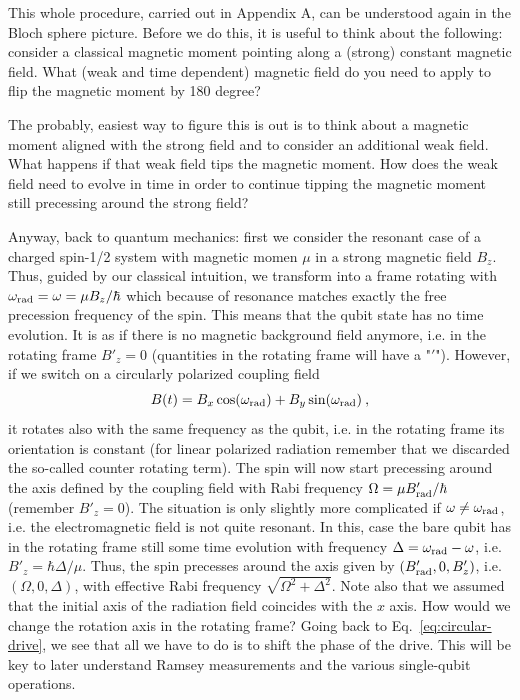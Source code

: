 \documentclass{../lab}
\begin{document}
This whole procedure, carried out in Appendix A, can be understood again in the Bloch sphere picture. Before we do this, it is useful to think about the following: consider a classical magnetic moment pointing along a (strong) constant magnetic field. What (weak and time dependent) magnetic field  do you need to apply to flip the magnetic moment by 180 degree? 

The probably, easiest way to figure this is out is to think about a magnetic moment aligned with the strong field and to consider an additional weak field. What happens if that weak field tips the magnetic moment. How does the weak field need to evolve in time in order to continue tipping the magnetic moment still precessing around the strong field?

Anyway, back to quantum mechanics: first we consider the resonant case of a charged spin-1/2 system with magnetic momen $\mu$ in a strong magnetic field $B_z$. Thus, guided by our classical intuition, we transform into a frame rotating with $\omega_{\rm rad}=\omega = \mu B_z/\hbar$ which because of resonance matches exactly the free precession frequency of the spin. This means that the qubit state has no time evolution. It is as if there is no magnetic background field anymore, i.e. in the rotating frame $B'_z=0$ (quantities in the rotating frame will have a "$'$"). However, if we switch on a circularly polarized coupling field 
\begin{equation}\label{eq:circular-drive}
B(t)=B_x\cos(\omega_{\rm rad}) + B_y\sin(\omega_{\rm rad})\:,
\end{equation}it rotates also with the same frequency as the qubit, i.e. in the rotating frame its orientation is constant (for linear polarized radiation remember that we discarded the so-called counter rotating term). 
The spin will now start precessing around the axis defined by the coupling field with Rabi frequency $\Omega=\mu B'_{\rm rad}/\hbar$ (remember $B'_z=0$).
The situation is only slightly more complicated if $\omega \neq \omega_{\rm rad}$, i.e. the electromagnetic field is not quite resonant. In this, case the bare qubit has in the rotating frame still some time evolution
with frequency $\Delta=\omega_{\rm rad}-\omega$, i.e. $B'_z=\hbar \Delta /\mu$. 
Thus, the spin precesses around the axis given by $(B'_{\rm rad},0,B'_z)$, 
i.e. $(\Omega, 0, \Delta)$, with effective Rabi frequency $\sqrt{\Omega^2+\Delta^2}$.
Note also that we assumed that the initial axis of the 
radiation field coincides with the $x$ axis. How would we change the rotation axis in the rotating frame? Going back to
Eq.~\ref{eq:circular-drive}, we see that all we have to do is to shift the phase of the drive. This will be key to later understand Ramsey measurements and the various single-qubit operations. 
\end{document}
